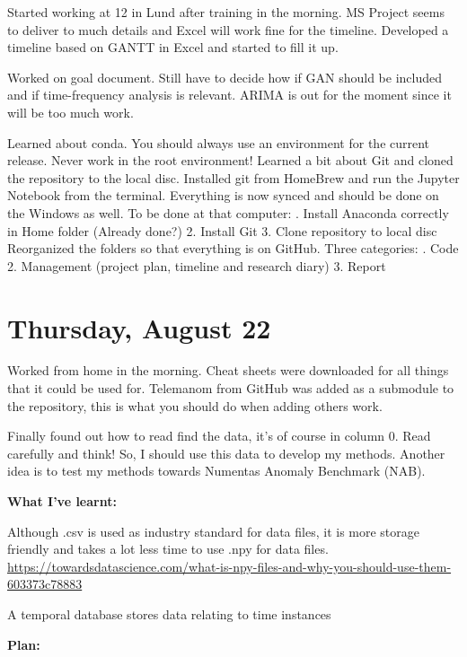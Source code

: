 \documentclass[11pt,letterpaper]{article}
\begin{document}
Started working at 12 in Lund after training in the morning. MS Project seems to deliver to much details and Excel will work fine for the timeline. Developed a timeline based on GANTT in Excel and started to fill it up.

Worked on goal document. Still have to decide how if GAN should be included and if time-frequency analysis is relevant. ARIMA is out for the moment since it will be too much work.

Learned about conda. You should always use an environment for the current release. Never work in the root environment! Learned a bit about Git and cloned the repository to the local disc. Installed git from HomeBrew and run the Jupyter Notebook from the terminal. Everything is now synced and should be done on the Windows as well. To be done at that computer: . Install Anaconda correctly in Home folder (Already done?)
2. Install Git
3. Clone repository to local disc
Reorganized the folders so that everything is on GitHub. Three categories: . Code 
2. Management (project plan, timeline and research diary)
3. Report



\section*{Thursday, August 22}

Worked from home in the morning. Cheat sheets were downloaded for all things that it could be used for. Telemanom from GitHub was added as a submodule to the repository, this is what you should do when adding others work.

Finally found out how to read find the data, it's of course in column 0. Read carefully and think! So, I should use this data to develop my methods. Another idea is to test my methods towards Numentas Anomaly Benchmark (NAB).

\textbf{What I've learnt:}

Although .csv is used as industry standard for data files, it is more storage friendly and takes a lot less time to use .npy for data files. \newline
\url{https://towardsdatascience.com/what-is-npy-files-and-why-you-should-use-them-603373c78883}

A temporal database stores data relating to time instances


\textbf{Plan: }
\end{document}
